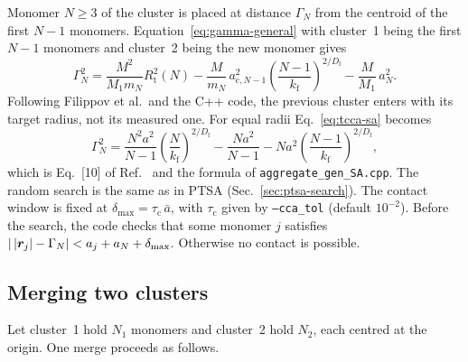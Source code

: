 \documentclass[11pt,a4paper]{article}
\newcommand{\abar}{\bar{a}}
\newcommand{\Df}{D_\text{f}}
\newcommand{\kf}{k_\text{f}}
\newcommand{\dmax}{\delta_\text{max}}
\begin{document}
Monomer $N \ge 3$ of the cluster is placed at distance $\Gamma_N$ from the centroid of the first $N-1$ monomers.
Equation~\eqref{eq:gamma-general} with cluster~1 being the first $N-1$ monomers and cluster~2 being the new monomer gives
\begin{equation}
  \Gamma_N^2 = \frac{M^2}{M_1 m_N} R_\text{t}^2(N)
             - \frac{M}{m_N}\, a_{\text{c},N-1}^2 \left( \frac{N-1}{\kf} \right)^{2/\Df}
             - \frac{M}{M_1}\, a_N^2 .
  \label{eq:tcca-sa}
\end{equation}
Following Filippov et al.\ and the C++ code, the previous cluster enters with its target radius, not its measured one.
For equal radii Eq.~\eqref{eq:tcca-sa} becomes
\begin{equation}
  \Gamma_N^2 = \frac{N^2 a^2}{N-1} \left( \frac{N}{\kf} \right)^{2/\Df}
             - \frac{N a^2}{N-1}
             - N a^2 \left( \frac{N-1}{\kf} \right)^{2/\Df} ,
  \label{eq:tcca-sa-mono}
\end{equation}
which is Eq.~[10] of Ref.~\cite{filippov2000} and the formula of \texttt{aggregate\_gen\_SA.cpp}.
The random search is the same as in PTSA (Sec.~\ref{sec:ptsa-search}).
The contact window is fixed at $\dmax = \tau_\text{c}\,\abar$, with $\tau_\text{c}$ given by \texttt{--cca\_tol} (default $10^{-2}$).
Before the search, the code checks that some monomer $j$ satisfies $\abs{\,\abs{\bm{r}_j} - \Gamma_N} < a_j + a_N + \dmax$.
Otherwise no contact is possible.

\subsection{Merging two clusters}
\label{sec:tcca-merge}

Let cluster~1 hold $N_1$ monomers and cluster~2 hold $N_2$, each centred at the origin.
One merge proceeds as follows.
\end{document}

